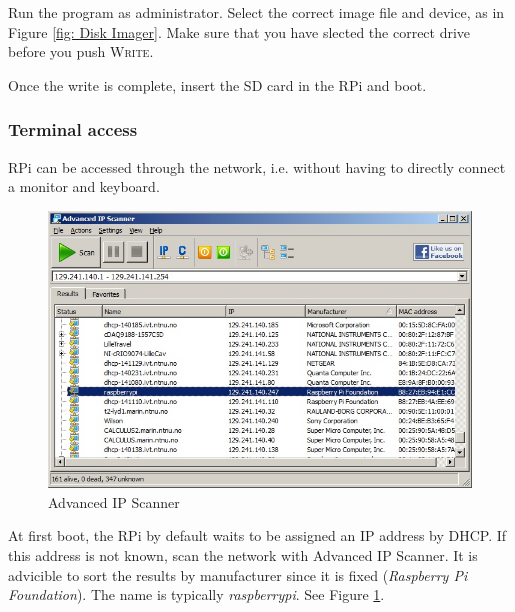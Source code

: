 \documentclass[a4paper,twoside,english]{report}
\newcommand{\noun}[1]{\textsc{#1}}
\begin{document}
Run the program as administrator. Select the correct image file and
device, as in Figure \ref{fig: Disk Imager}. Make sure that you have
slected the correct drive before you push \noun{Write}.

Once the write is complete, insert the SD card in the RPi and boot.

\subsubsection{\label{subsec: Terminal access}Terminal access}

RPi can be accessed through the network, i.e. without having to directly
connect a monitor and keyboard.

\begin{figure}[h!]
\centering \includegraphics[scale=0.45]{fig/advancedIPscanner} \caption{Advanced IP Scanner}

\label{fig: Advanced IP Scanner} 
\end{figure}

At first boot, the RPi by default waits to be assigned an IP address
by DHCP. If this address is not known, scan the network with Advanced
IP Scanner. It is advicible to sort the results by manufacturer since
it is fixed (\textit{Raspberry Pi Foundation}). The name is typically
\emph{raspberrypi}. See Figure \ref{fig: Advanced IP Scanner}.
\end{document}
